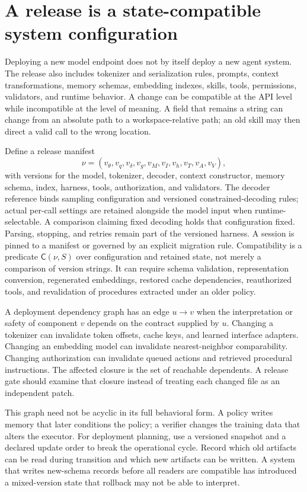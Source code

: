 \section{A release is a state-compatible system configuration}\label{sec:C32:01}
Deploying a new model endpoint does not by itself deploy a new agent system. The release also includes tokenizer and serialization rules, prompts, context transformations, memory schemas, embedding indexes, skills, tools, permissions, validators, and runtime behavior. A change can be compatible at the API level while incompatible at the level of meaning. A field that remains a string can change from an absolute path to a workspace-relative path; an old skill may then direct a valid call to the wrong location.

Define a release manifest
\begin{equation}
 \nu=(v_\theta,v_q,v_\delta,v_g,v_M,v_I,v_h,v_T,v_A,v_V),
\end{equation}
with versions for the model, tokenizer, decoder, context constructor, memory schema, index, harness, tools, authorization, and validators. The decoder reference binds sampling configuration and versioned constrained-decoding rules; actual per-call settings are retained alongside the model input when runtime-selectable. A comparison claiming fixed decoding holds that configuration fixed. Parsing, stopping, and retries remain part of the versioned harness. A session is pinned to a manifest or governed by an explicit migration rule. Compatibility is a predicate $\mathsf C(\nu,S)$ over configuration and retained state, not merely a comparison of version strings. It can require schema validation, representation conversion, regenerated embeddings, restored cache dependencies, reauthorized tools, and revalidation of procedures extracted under an older policy.

A deployment dependency graph has an edge $u\to v$ when the interpretation or safety of component $v$ depends on the contract supplied by $u$. Changing a tokenizer can invalidate token offsets, cache keys, and learned interface adapters. Changing an embedding model can invalidate nearest-neighbor comparability. Changing authorization can invalidate queued actions and retrieved procedural instructions. The affected closure is the set of reachable dependents. A release gate should examine that closure instead of treating each changed file as an independent patch.

This graph need not be acyclic in its full behavioral form. A policy writes memory that later conditions the policy; a verifier changes the training data that alters the executor. For deployment planning, use a versioned snapshot and a declared update order to break the operational cycle. Record which old artifacts can be read during transition and which new artifacts can be written. A system that writes new-schema records before all readers are compatible has introduced a mixed-version state that rollback may not be able to interpret.

